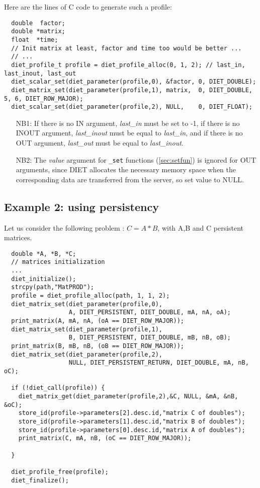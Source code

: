 Here are the lines of C code to generate such a profile:
{\footnotesize
\begin{verbatim}
  double  factor;
  double *matrix;
  float  *time;
  // Init matrix at least, factor and time too would be better ...
  // ...
  diet_profile_t profile = diet_profile_alloc(0, 1, 2); // last_in, last_inout, last_out
  diet_scalar_set(diet_parameter(profile,0), &factor, 0, DIET_DOUBLE);
  diet_matrix_set(diet_parameter(profile,1), matrix,  0, DIET_DOUBLE, 5, 6, DIET_ROW_MAJOR);
  diet_scalar_set(diet_parameter(profile,2), NULL,    0, DIET_FLOAT);
\end{verbatim}
}

\begin{itemize}
\item[NB1:] If there is no IN argument, \emph{last\_in} must be set to
  -1, if there is no INOUT argument, \emph{last\_inout} must
  be equal to \emph{last\_in}, and if there is no OUT argument,
  \emph{last\_out} must be equal to \emph{last\_inout}.
\item[NB2:] The \emph{value} argument for \texttt{\_set} functions
  (\ref{sec:setfun}) is ignored for OUT arguments, since DIET
  allocates the necessary memory space when the corresponding data are
  transferred from the server, so set value to NULL.
\end{itemize}

\subsection{Example 2: using persistency}

Let us consider the following problem : $C=A*B$, with A,B and C
persistent matrices.


{\footnotesize
\begin{verbatim}
  double *A, *B, *C; 
  // matrices initialization
  ...
  diet_initialize();
  strcpy(path,"MatPROD");
  profile = diet_profile_alloc(path, 1, 1, 2);
  diet_matrix_set(diet_parameter(profile,0),
                  A, DIET_PERSISTENT, DIET_DOUBLE, mA, nA, oA);
  print_matrix(A, mA, nA, (oA == DIET_ROW_MAJOR));
  diet_matrix_set(diet_parameter(profile,1),
                  B, DIET_PERSISTENT, DIET_DOUBLE, mB, nB, oB);
  print_matrix(B, mB, nB, (oB == DIET_ROW_MAJOR));
  diet_matrix_set(diet_parameter(profile,2),
                  NULL, DIET_PERSISTENT_RETURN, DIET_DOUBLE, mA, nB, oC);
  
  if (!diet_call(profile)) {
    diet_matrix_get(diet_parameter(profile,2),&C, NULL, &mA, &nB, &oC);
    store_id(profile->parameters[2].desc.id,"matrix C of doubles");
    store_id(profile->parameters[1].desc.id,"matrix B of doubles");
    store_id(profile->parameters[0].desc.id,"matrix A of doubles");
    print_matrix(C, mA, nB, (oC == DIET_ROW_MAJOR));
      
  }

  diet_profile_free(profile);
  diet_finalize();
\end{verbatim}
}

